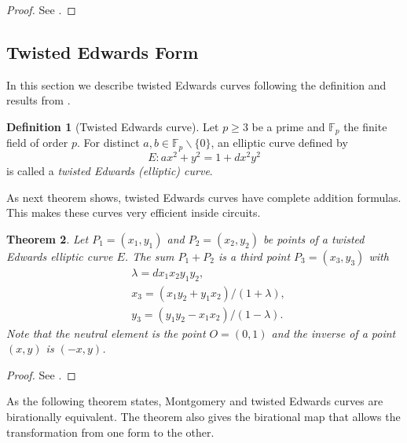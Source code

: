 \documentclass{article}
\newcommand{\Fp}{\ensuremath{\mathbb{F}_p}}
\newcommand{\point}[1]{P_{#1} = (x_{#1}, y_{#1})}
\newtheorem{thm}{Theorem}[section]
\theoremstyle{definition}
\newtheorem{defn}[thm]{Definition}
\theoremstyle{remark}
\begin{document}
\begin{spacing}{1.2}
\begin{multicols}{2}
\begin{proof}
See \cite[Sec. 10.3.2]{Okeya:2000:ECM:648117.746614}.
\end{proof}
		
\subsection{Twisted Edwards Form} \label{sec-ted}

In this section we describe twisted Edwards curves following the definition and results from  \cite{cryptoeprint:2008:013}.
	
\begin{defn}[Twisted Edwards curve]
Let $p\geq 3$ be a prime and $\Fp$ the finite field of order $p$. For distinct $a, b\in\Fp\backslash\{0\}$, an elliptic curve defined by 
	$$ E : a x^2 + y^2 = 1 + d x^2 y^2 $$
is called a {\it twisted Edwards (elliptic) curve}. 
\end{defn}

As next theorem shows, twisted Edwards curves have complete addition formulas. This makes these curves very efficient inside circuits.
	
\begin{thm}%
Let $\point{1}$ and $\point{2}$ be points of a twisted Edwards elliptic curve $E$. The sum $P_1 + P_2$ is a third point $P_3 = (x_3, y_3)$ with 
	\begin{align*}
		&\lambda = d x_1x_2y_1y_2,\\
		&x_3 = (x_1y_2 + y_1x_2) / (1 + \lambda),\\
		&y_3 = (y_1y_2 - x_1x_2) / (1 - \lambda).
	\end{align*}
Note that the neutral element is the point $O = (0,1)$ and the inverse of a point $(x,y)$ is $(-x,y)$.
\end{thm}

\begin{proof}
See \cite[Sec. 3]{formulae}.
\end{proof}

As the following theorem states, Montgomery and twisted Edwards curves are birationally equivalent. The theorem also gives %
the birational map that allows the transformation from one form to the other. 


\end{multicols}
\end{spacing}
\end{document}
